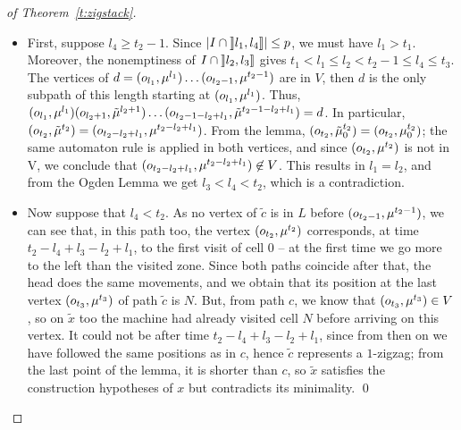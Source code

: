 \documentclass{llncs}
\newcommand{\card}[1]{\left|#1\right|}
\begin{document}
\begin{proof}[of Theorem~\ref{t:zigstack}]
\begin{itemize}
\item First, suppose $l_4\ge t_2-1$. 
Since $\card{I\cap\oc{l_1}{l_4}}\le p$, we must have $l_1>t_1$.
Moreover, the nonemptiness of $I\cap\oc{l_2}{l_3}$ gives $t_1<l_1\le l_2<t_2-1\le l_4\le t_3$.
The vertices of $d=\pile{l_1}\ldots\pile{t_2-1}$ are in $V$, then $d$ is the only subpath of this length starting at $\pile{l_1}$.
Thus, $\pile{l_1}\pile[\tilde]{l_2+1}\ldots\pile[\tilde]{t_2-1-l_2+l_1}=d$.
In particular, $\pile[\tilde]{t_2}=\pile{t_2-l_2+l_1}$.
From the lemma, $\pilo[\tilde]{t_2}=\pilo{t_2}$; the same automaton rule is applied in both vertices, and since $\pile{t_2}$ is not in V, we conclude that  $\pile{t_2-l_2+l_1}\not \in V$.
This results in $l_1=l_2$, and from the Ogden Lemma we get $l_3<l_4<t_2$, which is a contradiction.

\item Now suppose that $l_4<t_2$. As no vertex of $\tilde c$ is in $L$ before $\pile{t_2-1}$, we can see that, in this path too, the vertex $\pile{t_2}$ corresponds, at time $t_2-l_4+l_3-l_2+l_1$, to the first visit of cell $0$ -- at the first time we go more to the left than the visited zone.
Since both paths coincide after that, the head does the same movements, and we obtain that its position at the last vertex $\pile{t_3}$ of path $\tilde c$ is $N$. But, from path $c$, we know that $\pile{t_3}\in V$, so on $\tilde x$ too the machine had already visited cell $N$ before arriving on this vertex. It could not be after time $t_2-l_4+l_3-l_2+l_1$, since from then on we have followed the same positions as in $c$, hence $\tilde c$ represents a $1$-zigzag; from the last point of the lemma, it is shorter than $c$, so $\tilde x$ satisfies the construction hypotheses of $x$ but contradicts its minimality.
\qed
\end{itemize}
\end{proof}
\end{document}
